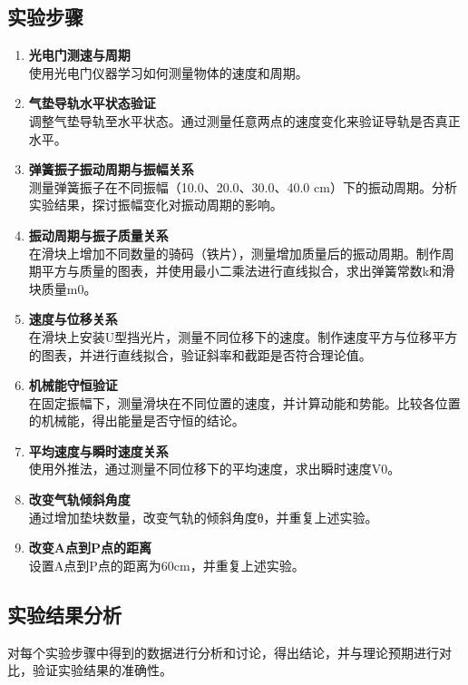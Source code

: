 \documentclass[UTF8]{article}
\theoremstyle{MyLineTheoremStyle} %
\theoremstyle{MyBlockTheoremStyle} %
\theoremstyle{MySubsubsectionStyle} %
\begin{document}
\subsection{实验步骤}
\begin{enumerate}
    \item \textbf{光电门测速与周期} \\
    使用光电门仪器学习如何测量物体的速度和周期。

    \item \textbf{气垫导轨水平状态验证} \\
    调整气垫导轨至水平状态。通过测量任意两点的速度变化来验证导轨是否真正水平。

    \item \textbf{弹簧振子振动周期与振幅关系} \\
    测量弹簧振子在不同振幅（10.0、20.0、30.0、40.0 cm）下的振动周期。分析实验结果，探讨振幅变化对振动周期的影响。

    \item \textbf{振动周期与振子质量关系} \\
    在滑块上增加不同数量的骑码（铁片），测量增加质量后的振动周期。制作周期平方与质量的图表，并使用最小二乘法进行直线拟合，求出弹簧常数k和滑块质量m0。

    \item \textbf{速度与位移关系} \\
    在滑块上安装U型挡光片，测量不同位移下的速度。制作速度平方与位移平方的图表，并进行直线拟合，验证斜率和截距是否符合理论值。

    \item \textbf{机械能守恒验证} \\
    在固定振幅下，测量滑块在不同位置的速度，并计算动能和势能。比较各位置的机械能，得出能量是否守恒的结论。

    \item \textbf{平均速度与瞬时速度关系} \\
    使用外推法，通过测量不同位移下的平均速度，求出瞬时速度V0。

    \item \textbf{改变气轨倾斜角度} \\
    通过增加垫块数量，改变气轨的倾斜角度θ，并重复上述实验。

    \item \textbf{改变A点到P点的距离} \\
    设置A点到P点的距离为60cm，并重复上述实验。
\end{enumerate}

\subsection{实验结果分析}
对每个实验步骤中得到的数据进行分析和讨论，得出结论，并与理论预期进行对比，验证实验结果的准确性。
\end{document}
